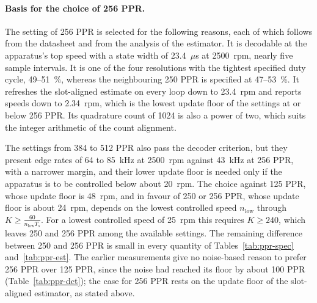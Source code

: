 
\paragraph{Basis for the choice of 256 PPR.}
The setting of 256 PPR is selected for the following reasons, each of which follows from the datasheet and from the analysis of the estimator. It is decodable at the apparatus's top speed with a state width of 23.4~$\mu$s at 2500~rpm, nearly five sample intervals. It is one of the four resolutions with the tightest specified duty cycle, 49--51~\%, whereas the neighbouring 250 PPR is specified at 47--53~\%. It refreshes the slot-aligned estimate on every loop down to 23.4~rpm and reports speeds down to 2.34~rpm, which is the lowest update floor of the settings at or below 256 PPR. Its quadrature count of 1024 is also a power of two, which suits the integer arithmetic of the count alignment.

The settings from 384 to 512 PPR also pass the decoder criterion, but they present edge rates of 64 to 85~kHz at 2500~rpm against 43~kHz at 256 PPR, with a narrower margin, and their lower update floor is needed only if the apparatus is to be controlled below about 20~rpm. The choice against 125 PPR, whose update floor is 48~rpm, and in favour of 250 or 256 PPR, whose update floor is about 24~rpm, depends on the lowest controlled speed $n_{\text{low}}$ through $K \geq \frac{60}{n_{\text{low}} T_s}$. For a lowest controlled speed of 25~rpm this requires $K \geq 240$, which leaves 250 and 256 PPR among the available settings. The remaining difference between 250 and 256 PPR is small in every quantity of Tables~\ref{tab:ppr-spec} and~\ref{tab:ppr-est}. The earlier measurements give no noise-based reason to prefer 256 PPR over 125 PPR, since the noise had reached its floor by about 100 PPR (Table~\ref{tab:ppr-dct}); the case for 256 PPR rests on the update floor of the slot-aligned estimator, as stated above.

